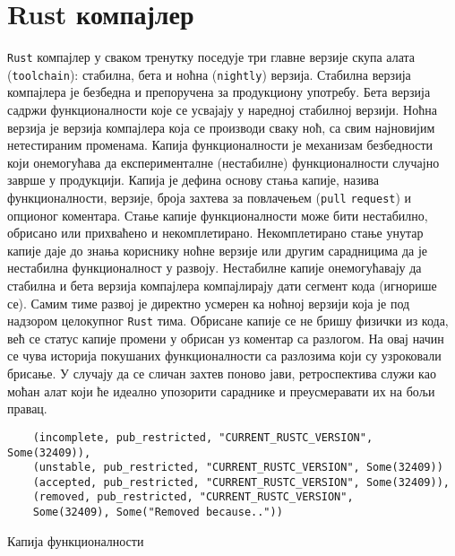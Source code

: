 \section{Rust компајлер}

\verb|Rust| компајлер у сваком тренутку поседује три главне верзије скупа алата (\verb|toolchain|): стабилна, бета и ноћна (\verb|nightly|) верзија.
Стабилна верзија компајлера је безбедна и препоручена за продукциону употребу. Бета верзија садржи функционалности
које се усвајају у наредној стабилној верзији. Ноћна верзија је верзија компајлера која се 
производи сваку ноћ, са свим најновијим нетестираним променама. Капија функционалности је механизам безбедности
који онемогућава да експерименталне (нестабилне) функционалности случајно заврше у продукцији. 
Капија је дефи на основу стања капије, назива функционалности, верзије, броја захтева за повлачењем
(\verb|pull| \verb|request|) и опционог коментара.
Стање капије функционалности може бити нестабилно, обрисано или прихваћено и некомплетирано. Некомплетирано 
стање унутар капије даје до знања кориснику ноћне верзије или другим сарадницима да је нестабилна функционалност 
у развоју.  Нестабилне капије онемогућавају да стабилна и бета верзија компајлера компајлирају 
дати сегмент кода (игнорише се).  Самим тиме развој је директно 
усмерен ка ноћној верзији која је под надзором целокупног \verb|Rust| тима. Обрисане капије се не бришу физички из кода,
већ се статус капије промени у обрисан уз коментар са разлогом. На овај начин се чува историја покушаних 
функционалности са разлозима који су узроковали брисање. У случају да се сличан захтев поново јави, ретроспектива
служи као моћан алат који ће идеално упозорити сараднике и преусмеравати их на бољи правац.

\begin{listing}[H]
\begin{verbatim}
    (incomplete, pub_restricted, "CURRENT_RUSTC_VERSION", Some(32409)),
    (unstable, pub_restricted, "CURRENT_RUSTC_VERSION", Some(32409))
    (accepted, pub_restricted, "CURRENT_RUSTC_VERSION", Some(32409)),
    (removed, pub_restricted, "CURRENT_RUSTC_VERSION", 
    Some(32409), Some("Removed because.."))
\end{verbatim}
\caption{Капија функционалности}
\label{lst:rustup_gate}
\end{listing}

